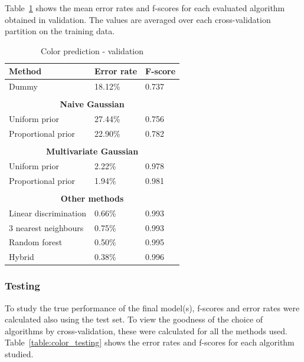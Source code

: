 \documentclass[twoside]{article}
\begin{document}
\begin{multicols}{2}
Table~\ref{table:color_validation} shows the mean error rates and f-scores for each evaluated algorithm obtained in validation. The values are averaged over each
cross-validation partition on the training data.

\begin{table}[H]
\caption{Color prediction - validation}
\label{table:color_validation}
\begin{tabular}{lll}
\textbf{Method} & \textbf{Error rate} & \textbf{F-score}\\
\midrule
Dummy & 18.12\% & 0.737 \\
\\
\multicolumn{3}{c}{\textbf{Naive Gaussian}} \\
Uniform prior & 27.44\% & 0.756 \\
Proportional prior & 22.90\% & 0.782 \\
\\
\multicolumn{3}{c}{\textbf{Multivariate Gaussian}} \\
Uniform prior & 2.22\% & 0.978 \\
Proportional prior & 1.94\% & 0.981 \\
\\
\multicolumn{3}{c}{\textbf{Other methods}} \\
Linear discrimination & 0.66\% & 0.993 \\
$3$ nearest neighbours & 0.75\% & 0.993 \\
Random forest & 0.50\% & 0.995 \\
Hybrid & 0.38\% & 0.996 \\

\end{tabular}
\end{table}

\subsubsection{Testing}

To study the true performance of the final model(s), f-scores and error rates were calculated also using the test set. To view
the goodness of the choice of algorithms by cross-validation, these were calculated for all the methods used. 
Table~\ref{table:color_testing} shows the error rates and f-scores for each algorithm studied.


\end{multicols}
\end{document}
